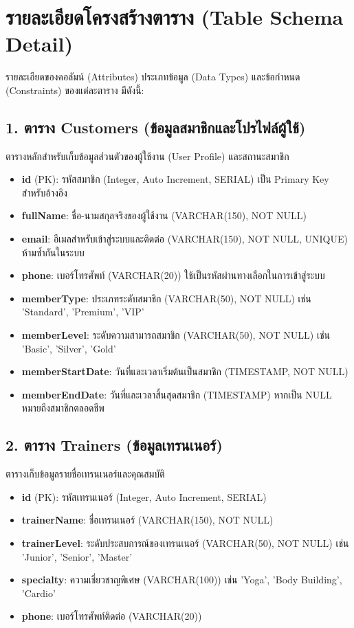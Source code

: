 \section{รายละเอียดโครงสร้างตาราง (Table Schema Detail)}
รายละเอียดของคอลัมน์ (Attributes) ประเภทข้อมูล (Data Types) และข้อกำหนด (Constraints) ของแต่ละตาราง มีดังนี้:

\subsection{1. ตาราง Customers (ข้อมูลสมาชิกและโปรไฟล์ผู้ใช้)}
ตารางหลักสำหรับเก็บข้อมูลส่วนตัวของผู้ใช้งาน (User Profile) และสถานะสมาชิก
\begin{itemize}
    \item \textbf{id} (PK): รหัสสมาชิก (Integer, Auto Increment, SERIAL) เป็น Primary Key สำหรับอ้างอิง
    \item \textbf{fullName}: ชื่อ-นามสกุลจริงของผู้ใช้งาน (VARCHAR(150), NOT NULL)
    \item \textbf{email}: อีเมลสำหรับเข้าสู่ระบบและติดต่อ (VARCHAR(150), NOT NULL, UNIQUE) ห้ามซ้ำกันในระบบ
    \item \textbf{phone}: เบอร์โทรศัพท์ (VARCHAR(20)) ใช้เป็นรหัสผ่านทางเลือกในการเข้าสู่ระบบ
    \item \textbf{memberType}: ประเภทระดับสมาชิก (VARCHAR(50), NOT NULL) เช่น 'Standard', 'Premium', 'VIP'
    \item \textbf{memberLevel}: ระดับความสามารถสมาชิก (VARCHAR(50), NOT NULL) เช่น 'Basic', 'Silver', 'Gold'
    \item \textbf{memberStartDate}: วันที่และเวลาเริ่มต้นเป็นสมาชิก (TIMESTAMP, NOT NULL)
    \item \textbf{memberEndDate}: วันที่และเวลาสิ้นสุดสมาชิก (TIMESTAMP) หากเป็น NULL หมายถึงสมาชิกตลอดชีพ
\end{itemize}

\subsection{2. ตาราง Trainers (ข้อมูลเทรนเนอร์)}
ตารางเก็บข้อมูลรายชื่อเทรนเนอร์และคุณสมบัติ
\begin{itemize}
    \item \textbf{id} (PK): รหัสเทรนเนอร์ (Integer, Auto Increment, SERIAL)
    \item \textbf{trainerName}: ชื่อเทรนเนอร์ (VARCHAR(150), NOT NULL)
    \item \textbf{trainerLevel}: ระดับประสบการณ์ของเทรนเนอร์ (VARCHAR(50), NOT NULL) เช่น 'Junior', 'Senior', 'Master'
    \item \textbf{specialty}: ความเชี่ยวชาญพิเศษ (VARCHAR(100)) เช่น 'Yoga', 'Body Building', 'Cardio'
    \item \textbf{phone}: เบอร์โทรศัพท์ติดต่อ (VARCHAR(20))
\end{itemize}

